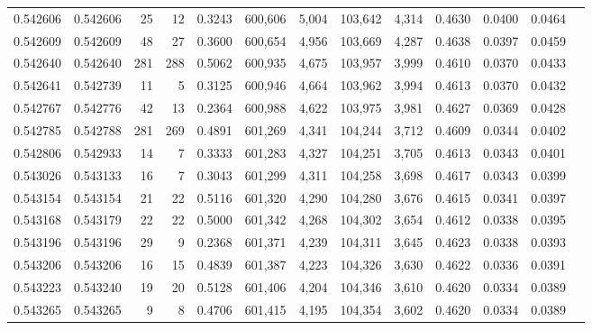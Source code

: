\begin{tabular}{rrrrrrrrrrrrr}
0.542606 & 0.542606 &    25 &    12 &                                     0.3243 & 600,606 &   5,004 & 103,642 &   4,314 & 0.4630 & 0.0400 & 0.0464 \\
0.542609 & 0.542609 &    48 &    27 &                                     0.3600 & 600,654 &   4,956 & 103,669 &   4,287 & 0.4638 & 0.0397 & 0.0459 \\
0.542640 & 0.542640 &   281 &   288 &                                     0.5062 & 600,935 &   4,675 & 103,957 &   3,999 & 0.4610 & 0.0370 & 0.0433 \\
0.542641 & 0.542739 &    11 &     5 &                                     0.3125 & 600,946 &   4,664 & 103,962 &   3,994 & 0.4613 & 0.0370 & 0.0432 \\
0.542767 & 0.542776 &    42 &    13 &                                     0.2364 & 600,988 &   4,622 & 103,975 &   3,981 & 0.4627 & 0.0369 & 0.0428 \\
0.542785 & 0.542788 &   281 &   269 &                                     0.4891 & 601,269 &   4,341 & 104,244 &   3,712 & 0.4609 & 0.0344 & 0.0402 \\
0.542806 & 0.542933 &    14 &     7 &                                     0.3333 & 601,283 &   4,327 & 104,251 &   3,705 & 0.4613 & 0.0343 & 0.0401 \\
0.543026 & 0.543133 &    16 &     7 &                                     0.3043 & 601,299 &   4,311 & 104,258 &   3,698 & 0.4617 & 0.0343 & 0.0399 \\
0.543154 & 0.543154 &    21 &    22 &                                     0.5116 & 601,320 &   4,290 & 104,280 &   3,676 & 0.4615 & 0.0341 & 0.0397 \\
0.543168 & 0.543179 &    22 &    22 &                                     0.5000 & 601,342 &   4,268 & 104,302 &   3,654 & 0.4612 & 0.0338 & 0.0395 \\
0.543196 & 0.543196 &    29 &     9 &                                     0.2368 & 601,371 &   4,239 & 104,311 &   3,645 & 0.4623 & 0.0338 & 0.0393 \\
0.543206 & 0.543206 &    16 &    15 &                                     0.4839 & 601,387 &   4,223 & 104,326 &   3,630 & 0.4622 & 0.0336 & 0.0391 \\
0.543223 & 0.543240 &    19 &    20 &                                     0.5128 & 601,406 &   4,204 & 104,346 &   3,610 & 0.4620 & 0.0334 & 0.0389 \\
0.543265 & 0.543265 &     9 &     8 &                                     0.4706 & 601,415 &   4,195 & 104,354 &   3,602 & 0.4620 & 0.0334 & 0.0389 \\

\end{tabular}
